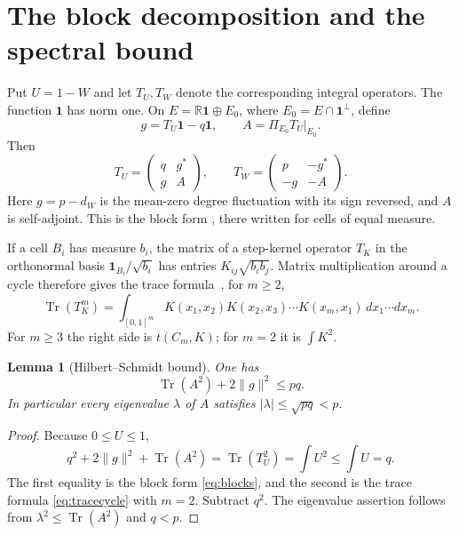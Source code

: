 \documentclass[11pt]{article}
\numberwithin{equation}{section}
\newtheorem{lemma}[theorem]{Lemma}
\theoremstyle{remark}
\newcommand{\Tr}{\operatorname{Tr}}
\newcommand{\one}{\mathbf 1}
\newcommand{\R}{\mathbb R}
\newcommand{\norm}[1]{\lVert #1\rVert}
\begin{document}
\section{The block decomposition and the spectral bound}
Put $U=1-W$ and let $T_U,T_W$ denote the corresponding integral operators. The function $\one$ has norm one. On $E=\R\one\oplus E_0$, where $E_0=E\cap\one^\perp$, define
\[
 g=T_U\one-q\one,\qquad A=\Pi_{E_0}T_U|_{E_0}.
\]
Then
\begin{equation}\label{eq:blocks}
 T_U=\begin{pmatrix}q&g^*\\g&A\end{pmatrix},\qquad
 T_W=\begin{pmatrix}p&-g^*\\-g&-A\end{pmatrix}.
\end{equation}
Here $g=p-d_W$ is the mean-zero degree fluctuation with its sign reversed, and $A$ is self-adjoint. This is the block form \cite[Eq.~(2.2)]{kim2026goodman}, there written for cells of equal measure.

If a cell $B_i$ has measure $b_i$, the matrix of a step-kernel operator $T_K$ in the orthonormal basis $\one_{B_i}/\sqrt{b_i}$ has entries $K_{ij}\sqrt{b_ib_j}$. Matrix multiplication around a cycle therefore gives the trace formula~\cite{lovasz2012large}, for $m\ge2$,
\begin{equation}\label{eq:tracecycle}
 \Tr(T_K^m)=\int_{[0,1]^m}K(x_1,x_2)K(x_2,x_3)\cdots K(x_m,x_1)\,dx_1\cdots dx_m .
\end{equation}
For $m\ge3$ the right side is $t(C_m,K)$; for $m=2$ it is $\int K^2$.

\begin{lemma}[Hilbert--Schmidt bound]\label{lem:HS}
One has
\begin{equation}\label{eq:HS}
 \Tr(A^2)+2\norm g^2\le pq.
\end{equation}
In particular every eigenvalue $\lambda$ of $A$ satisfies $|\lambda|\le\sqrt{pq}<p$.
\end{lemma}
\begin{proof}
Because $0\le U\le1$,
\[
 q^2+2\norm g^2+\Tr(A^2)=\Tr(T_U^2)=\int U^2\le\int U=q.
\]
The first equality is the block form \eqref{eq:blocks}, and the second is the trace formula \eqref{eq:tracecycle} with $m=2$. Subtract $q^2$. The eigenvalue assertion follows from $\lambda^2\le\Tr(A^2)$ and $q<p$.
\end{proof}
\end{document}
